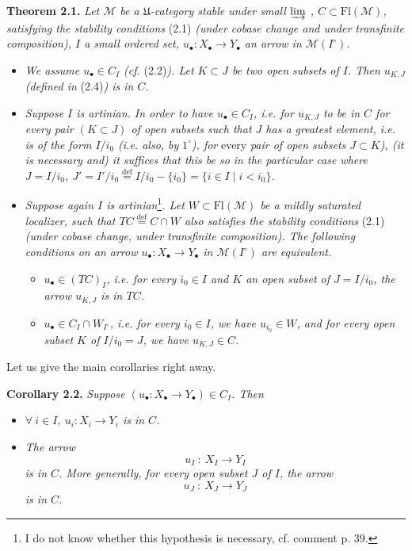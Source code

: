 \documentclass[11pt]{article}
\newcommand{\msp}[1]{\marginpar{\footnotesize [#1]}}
\newcommand{\Fl}{\mathrm{Fl}}
\newcommand{\M}{\mathcal{M}}
\begin{document}
\textbf{Theorem 2.1.} \textit{Let $\M$ be a $\mathfrak{U}$-category stable under small $\varinjlim$ , $C \subset \Fl(\M)$, satisfying the stability conditions} \textup{(2.1)} \textit{(under cobase change and under transfinite composition), $I$ a small ordered set, $u_\bullet : X_\bullet \longrightarrow Y_\bullet$ an arrow in $\M(I^\circ)$.}
\begin{itemize}[leftmargin=3em]
\item[$1^\circ$)] \textit{We assume $u_\bullet \in C_I$ (cf.} \textup{(2.2)}\textit{). Let $K \subset J$ be two open subsets of $I$. Then $u_{K,J}$ (defined in} \textup{(2.4)}\textit{) is in $C$.}
\item[$2^\circ$)] \textit{Suppose $I$ is artinian. In order to have $u_\bullet \in C_I$, i.e. for $u_{K,J}$ to be in $C$ for every pair $(K \subset J)$ of open subsets such that $J$ has a greatest element, i.e. is of the form $I/i_0$ (i.e. also, by} $1^\circ$\textit{), for} \textup{every} \textit{pair of open subsets $J \subset K$), (it is necessary and) it suffices that this be so in the particular case where $J = I/i_0$, $J' = I'/i_0 \overset{\text{def}}{=} I/i_0 - \{i_0\} = \{i \in I \mid i < i_0\}$.}

\msp{page 27}
\item[$3^\circ$)] \textit{Suppose again $I$ is artinian}\footnote[11]{I do not know whether this hypothesis is necessary, cf. comment p. 39.}\textit{. Let $W \subset \Fl(\M)$ be a mildly saturated localizer, such that $TC \overset{\text{def}}{=} C \cap W$ also satisfies the stability conditions} \textup{(2.1)} \textit{(under cobase change, under transfinite composition). The following conditions on an arrow $u_\bullet : X_\bullet \longrightarrow Y_\bullet$ in $\M(I^\circ)$ are equivalent.}
\begin{itemize}[leftmargin=2em]
\item[a)] \textit{$u_\bullet \in (TC)_I$, i.e. for every $i_0 \in I$ and $K$ an open subset of $J = I/i_0$, the arrow $u_{K,J}$ is in $TC$.}
\item[b)] \textit{$u_\bullet \in C_I \cap W_{I^\circ}$, i.e. for every $i_0 \in I$, we have $u_{i_0} \in W$, and for every open subset $K$ of $I/i_0 = J$, we have $u_{K,J} \in C$.}
\end{itemize}
\end{itemize}

Let us give the main corollaries right away.

\textbf{Corollary 2.2.} \textit{Suppose $(u_\bullet : X_\bullet \longrightarrow Y_\bullet) \in C_I$. Then}
\begin{itemize}[leftmargin=3em]
\item[a)] \textit{$\forall\ i \in I$, $u_i : X_i \longrightarrow Y_i$ is in $C$.}
\item[b)] \textit{The arrow}
\[
u_I \ :\ X_I \longrightarrow Y_I
\tag*{(2.2.1)}
\]
\textit{is in $C$. More generally, for every open subset $J$ of $I$, the arrow}
\[
u_J \ :\ X_J \longrightarrow Y_J
\tag*{(2.2.2)}
\]
\textit{is in $C$.}
\end{itemize}
\end{document}
